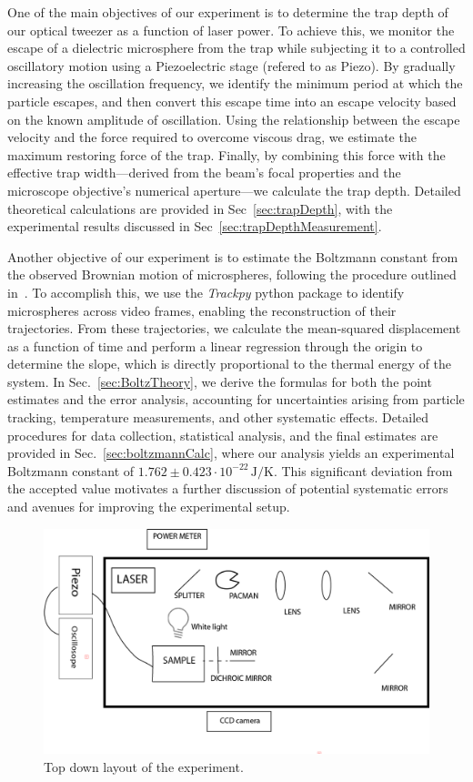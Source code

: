 \documentclass[aps,prb,twocolumn,superscriptaddress,floatfix,longbibliography,citeautoscript]{revtex4-2}
\begin{document}
One of the main objectives of our experiment is to determine the trap depth of our optical tweezer as a function of laser power. To achieve this, we monitor the escape of a dielectric microsphere from the trap while subjecting it to a controlled oscillatory motion using a Piezoelectric stage (refered to as Piezo). By gradually increasing the oscillation frequency, we identify the minimum period at which the particle escapes, and then convert this escape time into an escape velocity based on the known amplitude of oscillation. Using the relationship between the escape velocity and the force required to overcome viscous drag, we estimate the maximum restoring force of the trap. Finally, by combining this force with the effective trap width—derived from the beam's focal properties and the microscope objective's numerical aperture—we calculate the trap depth. Detailed theoretical calculations are provided in Sec~\ref{sec:trapDepth}, with the experimental results discussed in Sec~\ref{sec:trapDepthMeasurement}.

Another objective of our experiment is to estimate the Boltzmann constant from the observed Brownian motion of microspheres, following the procedure outlined in~\cite{nakroshis2003measuring}. To accomplish this, we use the \textit{Trackpy} python package to identify microspheres across video frames, enabling the reconstruction of their trajectories. From these trajectories, we calculate the mean-squared displacement as a function of time and perform a linear regression through the origin to determine the slope, which is directly proportional to the thermal energy of the system. In Sec.~\ref{sec:BoltzTheory}, we derive the formulas for both the point estimates and the error analysis, accounting for uncertainties arising from particle tracking, temperature measurements, and other systematic effects. Detailed procedures for data collection, statistical analysis, and the final estimates are provided in Sec.~\ref{sec:boltzmannCalc}, where our analysis yields an experimental Boltzmann constant of $1.762 \pm 0.423 \cdot 10^{-22}\,\si{\joule\per\kelvin}$. This significant deviation from the accepted value motivates a further discussion of potential systematic errors and avenues for improving the experimental setup.
\begin{figure}
    \centering
    \includegraphics[width=1\linewidth]{./figs/tweezer-schmatic.png}
    \caption{Top down layout of the experiment.}
    \label{fig:circuit}
\end{figure}
\end{document}
